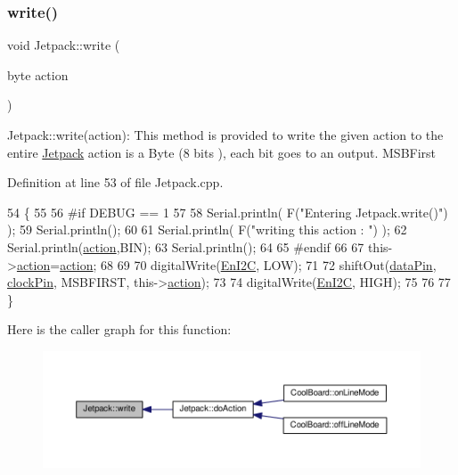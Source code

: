 \subsubsection{\texorpdfstring{write()}{write()}}
{\footnotesize\ttfamily void Jetpack\+::write (\begin{DoxyParamCaption}\item[{byte}]{action }\end{DoxyParamCaption})}

Jetpack\+::write(action)\+: This method is provided to write the given action to the entire \hyperlink{class_jetpack}{Jetpack} action is a Byte (8 bits ), each bit goes to an output. M\+S\+B\+First 

Definition at line 53 of file Jetpack.\+cpp.


\begin{DoxyCode}
54 \{
55 
56 \textcolor{preprocessor}{#if DEBUG == 1}
57 
58     Serial.println( F(\textcolor{stringliteral}{"Entering Jetpack.write()"}) );
59     Serial.println();
60 
61     Serial.println( F(\textcolor{stringliteral}{"writing this action : "}) );
62     Serial.println(\hyperlink{class_jetpack_aca3142925a7b0834b34ae91d26af7765}{action},BIN);
63     Serial.println();
64 
65 \textcolor{preprocessor}{#endif }
66 
67     this->\hyperlink{class_jetpack_aca3142925a7b0834b34ae91d26af7765}{action}=\hyperlink{class_jetpack_aca3142925a7b0834b34ae91d26af7765}{action};
68 
69     
70     digitalWrite(\hyperlink{class_jetpack_a81df984fb4cea98c71aa1a1cfcdfe814}{EnI2C}, LOW);
71     
72     shiftOut(\hyperlink{class_jetpack_a3d669a56e93c71dd25f970d4ed7d0c00}{dataPin}, \hyperlink{class_jetpack_a58ebb991f358f3ae94e82148b0221b5a}{clockPin}, MSBFIRST, this->\hyperlink{class_jetpack_aca3142925a7b0834b34ae91d26af7765}{action});
73 
74     digitalWrite(\hyperlink{class_jetpack_a81df984fb4cea98c71aa1a1cfcdfe814}{EnI2C}, HIGH);
75 
76 
77 \}
\end{DoxyCode}
Here is the caller graph for this function\+:\nopagebreak
\begin{figure}[H]
\begin{center}
\leavevmode
\includegraphics[width=350pt]{df/d1d/class_jetpack_a338f1af8cbc6504ac69b47c7328569b5_icgraph}
\end{center}
\end{figure}
\mbox{\label{class_jetpack_a79ae7bc3c1828a0551a7c005c4f8bd00}} 
